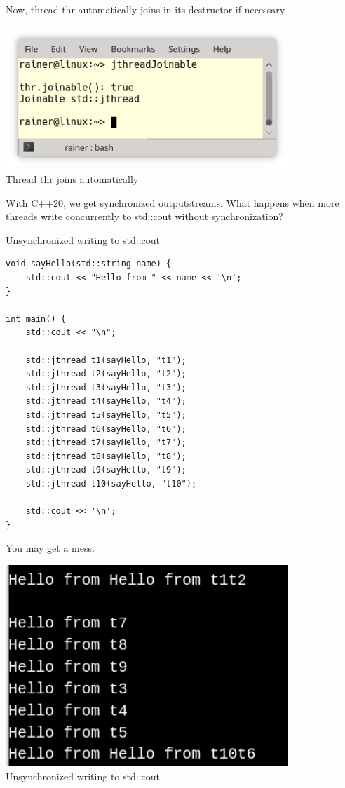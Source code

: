 Now, thread thr automatically joins in its destructor if necessary.

\begin{center}
\includegraphics[width=0.8\textwidth]{content/2/chapter3/images/10.png}\\
Thread thr joins automatically
\end{center}


With C++20, we get synchronized outputstreams. What happens when more threads write concurrently to std::cout without synchronization?

\noindent
Unsynchronized writing to std::cout
\begin{lstlisting}[style=styleCXX]
void sayHello(std::string name) {
	std::cout << "Hello from " << name << '\n';
}

int main() {
	std::cout << "\n";
	
	std::jthread t1(sayHello, "t1");
	std::jthread t2(sayHello, "t2");
	std::jthread t3(sayHello, "t3");
	std::jthread t4(sayHello, "t4");
	std::jthread t5(sayHello, "t5");
	std::jthread t6(sayHello, "t6");
	std::jthread t7(sayHello, "t7");
	std::jthread t8(sayHello, "t8");
	std::jthread t9(sayHello, "t9");
	std::jthread t10(sayHello, "t10");
	
	std::cout << '\n';
}
\end{lstlisting}

You may get a mess.

\begin{center}
\includegraphics[width=0.8\textwidth]{content/2/chapter3/images/11.png}\\
Unsynchronized writing to std::cout
\end{center}

